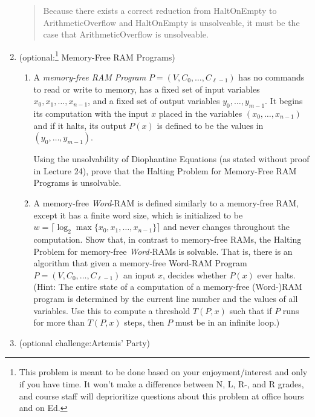 \documentclass[11pt]{article}
\begin{document}
\begin{enumerate}
\begin{quote}
     Because there exists a correct reduction from HaltOnEmpty to ArithmeticOverflow and HaltOnEmpty is unsolveable, it must be the case that ArithmeticOverflow is unsolveable. \\
  \end{quote}

    \item (optional:\footnote{This problem is meant to be done based on your enjoyment/interest and only if you have time. It won't make a difference between N, L, R-, and R grades, and course staff will deprioritize questions about this problem at office hours and on Ed.}  Memory-Free RAM Programs) 

\begin{enumerate}
\item A {\em memory-free
RAM Program} $P=(V,C_0,\ldots,C_{\ell-1})$ has no commands to read or write to memory, has a fixed set of input variables $x_0,x_1,\ldots,x_{n-1}$, and a fixed set of output variables $y_0,\ldots,y_{m-1}$.  It begins its computation with the
input $x$ placed in the variables $(x_0,\ldots,x_{n-1})$ and if it halts, its output $P(x)$ is defined to be the values in $(y_0,\ldots,y_{m-1})$.

Using the unsolvability of Diophantine Equations (as stated without proof in Lecture 24), prove that the Halting Problem for Memory-Free RAM Programs is unsolvable.


        \item
        A memory-free {\em Word}-RAM is defined similarly to a memory-free RAM, except it has a finite word size, which is initialized to be
        $w=\lceil \log_2 \max\{x_0,x_1,\ldots,x_{n-1}\}\rceil$ and never changes throughout the computation.
        Show that, in contrast to memory-free RAMs, the Halting Problem for memory-free {\em Word-}RAMs is solvable.  That is, there is an algorithm that
    given a memory-free Word-RAM Program $P=(V,C_0,\ldots,C_{\ell-1})$ an input $x$, decides whether $P(x)$ ever halts.
    (Hint: The entire state of a computation of a memory-free (Word-)RAM program is determined by the current line number and the values of all variables. Use this to compute a threshold $T(P,x)$ such that if $P$ runs for more than $T(P,x)$ steps, then $P$ must be in an infinite loop.)
 
    \end{enumerate}

   
    \item (optional challenge:\footnotemark[\value{footnote}] Artemis' Party) 


\end{enumerate}
\end{document}
